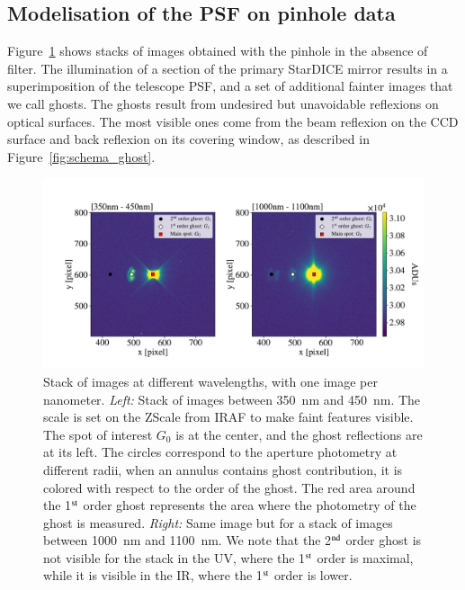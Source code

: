 \subsection{Modelisation of the \SD PSF on \spinhole pinhole data}
\label{sec:modelisation-sd-psf}

Figure~\ref{fig:ghost_contrast} shows stacks of images obtained with the \spinhole pinhole in the absence of filter. The illumination of a section of the primary StarDICE mirror results in a superimposition of the \SD telescope PSF, and a set of additional fainter images that we call ghosts. The ghosts result from undesired but unavoidable reflexions on optical surfaces. The most visible ones come from the beam reflexion on the CCD surface and back reflexion on its covering window, as described in Figure~\ref{fig:schema_ghost}.\\

\begin{figure}[h]
    \centering
    \includegraphics[width=\columnwidth]{fig/ghost_contrast.pdf}
    \caption{Stack of images at different wavelengths, with one image per nanometer. \textit{Left:} Stack of images between \SI{350}{\nano\meter} and \SI{450}{\nano\meter}. The scale is set on the ZScale from IRAF to make faint features visible. The spot of interest $G_0$ is at the center, and the ghost reflections are at its left. The circles correspond to the aperture photometry at different radii, when an annulus contains ghost contribution, it is colored with respect to the order of the ghost. The red area around the 1$\textsuperscript{st}$ order ghost represents the area where the photometry of the ghost is measured. \textit{Right:} Same image but for a stack of images between \SI{1000}{\nano\meter} and \SI{1100}{\nano\meter}. We note that the 2$\textsuperscript{nd}$ order ghost is not visible for the stack in the UV, where the 1$\textsuperscript{st}$ order is maximal, while it is visible in the IR, where the 1$\textsuperscript{st}$ order is lower.}
    \label{fig:ghost_contrast}
\end{figure}

